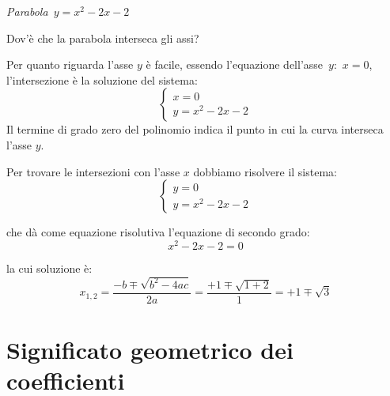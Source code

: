 \begin{minipage}{.40\textwidth}
\begin{center}
 \begin{inaccessibleblock}
  \graficotrinomio
  \emph{Parabola~\(y=x^2-2x-2\)}\label{fig:parabola_trinomio2}
\end{inaccessibleblock}
\end{center}
\end{minipage}
\hfill
\begin{minipage}{.55\textwidth}
Dov'è che la parabola interseca gli assi?

Per quanto riguarda l'asse \(y\) è facile, essendo l'equazione 
dell'asse~\(y\):~\(x=0\),
l'intersezione è la soluzione del sistema:
\[\left\{\begin{array}{l}
 x=0 \\
 y=x^2-2x-2 
\end{array}\right.\]
Il termine di grado zero del polinomio indica il punto in cui la curva 
interseca l'asse \(y\). 

Per trovare le intersezioni con l'asse \(x\) dobbiamo risolvere il sistema:
\[\left\{\begin{array}{l}
 y=0 \\
 y=x^2-2x-2 
\end{array}\right.\]

che dà come equazione risolutiva l'equazione di secondo grado:
\[x^2-2x-2=0\]

la cui soluzione è:
\[x_{1, 2} = \dfrac{-b \mp\sqrt{b^2-4ac}}{2a}=
             \dfrac{+1 \mp\sqrt{1+2}}{1}=+1 \mp\sqrt{3}\]

\end{minipage}


\section{Significato geometrico dei coefficienti}
\label{sec:parabola_coefficienti}



